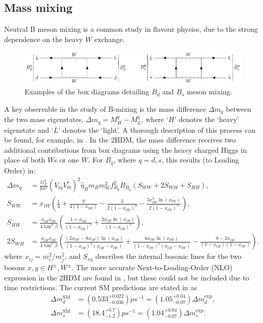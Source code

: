 \documentclass[a4paper,12pt]{article}
\begin{document}
\subsection{Mass mixing}
\label{subsec:mix}
Neutral B meson mixing is a common study in flavour physics, due to the strong dependence on the heavy $W$ exchange. 
\begin{figure}[ht]
    \centering
    \includegraphics[scale=0.8,trim=12em 44.5em 8em 12em,clip]{bmix.pdf}
    \caption{\label{fig:bmix} Examples of the box diagrams detailing $B_d$ and $B_s$ meson mixing.}
\end{figure}
A key observable in the study of B-mixing is the mass difference $\Delta m_q$ between the two mass eigenstates, $\Delta m_q = M_H^q - M_L^q$, where `$H$' denotes the `heavy' eigenstate and `$L$' denotes the `light'. 
A thorough description of this process can be found, for example, in \cite{mix15}.
In the 2HDM, the mass difference receives two additional contributions from box diagrams using the heavy charged Higgs in place of both $W$s or one $W$. 
For $B_q$, where $q=d,s$, this results (to Leading Order) in:
\begin{align}
    \Delta m_q &= \frac{G_F^2}{6\pi^2}(V_{tq}V_{tb}^*)^2\hat{\eta}_Bm_Bm_W^2f_{B_q}^2B_{B_q}(S_{WW}+2S_{WH}+S_{HH}), \\
    S_{WW} &= x_{tW}\left(\frac14+\frac{9}{4(1-x_{tW})}-\frac{3}{2(1-x_{tW})^2}-\frac{3x_{tW}^2\ln(x_{tW})}{2(1-x_{tW})^3}\right), \\
    S_{HH} &= \frac{x_{tH}x_{tW}}{4\tan^4\beta}\left(\frac{1+x_{tH}}{(1-x_{tH})^2}+\frac{2x_{tH}\ln(x_{tH})}{(1-x_{tH})^3}\right),\\
    2S_{WH} &= \frac{x_{tH}x_{tW}}{4\tan^2\beta}\left(\frac{(2x_{tW}-8x_{tH})\ln(x_{tH})}{(1-x_{tH})^2(x_{tH}-x_{tW})}+\frac{6x_{tW}\ln(x_{tW})}{(1-x_{tW})^2(x_{tH}-x_{tW})}-\frac{8-2x_{tW}}{(1-x_{tH})(1-x_{tW})}\right).
\end{align}
where $x_{ij} = m_i^2/m_j^2$, and $S_{xy}$ describes the internal bosonic lines for the two bosons $x,y \in H^\pm,W^\pm$.
The more accurate Next-to-Leading-Order (NLO) expression in the 2HDM are found in \cite{frank}, but these could not be included due to time restrictions.
The current SM predictions are stated in \cite{bmix} as
\begin{align}
    \Delta m^{\text{SM}}_d &= \left(0.533^{+0.022}_{-0.036}\right)ps^{-1} = \left(1.05^{+0.04}_{-0.07}\right)\Delta m_d^{\text{exp}}, \\
    \Delta m^{\text{SM}}_s &= \left(18.4^{+0.7}_{-1.2}\right)ps^{-1} = \left(1.04^{+0.04}_{-0.07}\right)\Delta m_s^{\text{exp}}.
\end{align}
\end{document}
